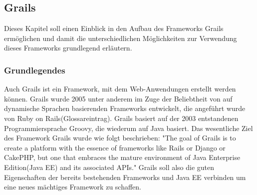 \subsection{Grails}
Dieses Kapitel soll einen Einblick in den Aufbau des Frameworks Grails ermöglichen und damit die unterschiedlichen Möglichkeiten zur Verwendung dieses Frameworks grundlegend erläutern.

\subsubsection{Grundlegendes}
Auch Grails ist ein Framework, mit dem Web-Anwendungen erstellt werden können. Grails wurde 2005 unter anderem im Zuge der Beliebtheit von auf dynamische Sprachen basierenden Frameworks entwickelt, die angeführt wurde von Ruby on Rails(Glossareintrag). Grails basiert auf der 2003 entstandenen Programmiersprache Groovy, die wiederum auf Java basiert. Das wesentliche Ziel des Framework Grails wurde wie folgt beschrieben: "The goal of Grails is to create a platform with the essence of frameworks like Rails or Django or CakePHP, but one that embraces the mature environment of Java Enterprise Edition(Java EE) and its associated APIs." Grails soll also die guten Eigenschaften der bereits bestehenden Frameworks und Java EE verbinden um eine neues mächtiges Framework zu schaffen.

